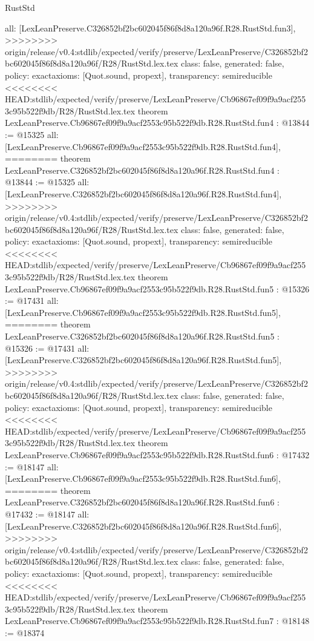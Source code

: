 \begin{lexlean}{RustStd}
\begin{coremodule}
{\begin{coremodule}
{{{{{{{  all: [LexLeanPreserve.C326852bf2bc602045f86f8d8a120a96f.R28.RustStd.fun3],
>>>>>>>> origin/release/v0.4:stdlib/expected/verify/preserve/LexLeanPreserve/C326852bf2bc602045f86f8d8a120a96f/R28/RustStd.lex.tex
  class: false,
  generated: false,
  policy: exact{axioms: [Quot.sound, propext]},
  transparency: semireducible
}
<<<<<<<< HEAD:stdlib/expected/verify/preserve/LexLeanPreserve/Cb96867ef09f9a9acf2553c95b522f9db/R28/RustStd.lex.tex
theorem LexLeanPreserve.Cb96867ef09f9a9acf2553c95b522f9db.R28.RustStd.fun4 : @13844 := @15325 {
  all: [LexLeanPreserve.Cb96867ef09f9a9acf2553c95b522f9db.R28.RustStd.fun4],
========
theorem LexLeanPreserve.C326852bf2bc602045f86f8d8a120a96f.R28.RustStd.fun4 : @13844 := @15325 {
  all: [LexLeanPreserve.C326852bf2bc602045f86f8d8a120a96f.R28.RustStd.fun4],
>>>>>>>> origin/release/v0.4:stdlib/expected/verify/preserve/LexLeanPreserve/C326852bf2bc602045f86f8d8a120a96f/R28/RustStd.lex.tex
  class: false,
  generated: false,
  policy: exact{axioms: [Quot.sound, propext]},
  transparency: semireducible
}
<<<<<<<< HEAD:stdlib/expected/verify/preserve/LexLeanPreserve/Cb96867ef09f9a9acf2553c95b522f9db/R28/RustStd.lex.tex
theorem LexLeanPreserve.Cb96867ef09f9a9acf2553c95b522f9db.R28.RustStd.fun5 : @15326 := @17431 {
  all: [LexLeanPreserve.Cb96867ef09f9a9acf2553c95b522f9db.R28.RustStd.fun5],
========
theorem LexLeanPreserve.C326852bf2bc602045f86f8d8a120a96f.R28.RustStd.fun5 : @15326 := @17431 {
  all: [LexLeanPreserve.C326852bf2bc602045f86f8d8a120a96f.R28.RustStd.fun5],
>>>>>>>> origin/release/v0.4:stdlib/expected/verify/preserve/LexLeanPreserve/C326852bf2bc602045f86f8d8a120a96f/R28/RustStd.lex.tex
  class: false,
  generated: false,
  policy: exact{axioms: [Quot.sound, propext]},
  transparency: semireducible
}
<<<<<<<< HEAD:stdlib/expected/verify/preserve/LexLeanPreserve/Cb96867ef09f9a9acf2553c95b522f9db/R28/RustStd.lex.tex
theorem LexLeanPreserve.Cb96867ef09f9a9acf2553c95b522f9db.R28.RustStd.fun6 : @17432 := @18147 {
  all: [LexLeanPreserve.Cb96867ef09f9a9acf2553c95b522f9db.R28.RustStd.fun6],
========
theorem LexLeanPreserve.C326852bf2bc602045f86f8d8a120a96f.R28.RustStd.fun6 : @17432 := @18147 {
  all: [LexLeanPreserve.C326852bf2bc602045f86f8d8a120a96f.R28.RustStd.fun6],
>>>>>>>> origin/release/v0.4:stdlib/expected/verify/preserve/LexLeanPreserve/C326852bf2bc602045f86f8d8a120a96f/R28/RustStd.lex.tex
  class: false,
  generated: false,
  policy: exact{axioms: [Quot.sound, propext]},
  transparency: semireducible
}
<<<<<<<< HEAD:stdlib/expected/verify/preserve/LexLeanPreserve/Cb96867ef09f9a9acf2553c95b522f9db/R28/RustStd.lex.tex
theorem LexLeanPreserve.Cb96867ef09f9a9acf2553c95b522f9db.R28.RustStd.fun7 : @18148 := @18374 {
}}}}}}}}}}
\end{coremodule}}
\end{coremodule}
\end{lexlean}
